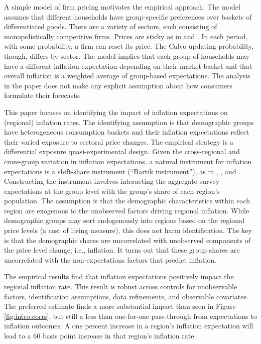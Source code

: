 \documentclass[12pt]{article}
\begin{document}
A simple model of firm pricing motivates the empirical approach. The model assumes that different households have group-specific preferences over baskets of differentiated goods. There are a variety of sectors, each consisting of monopolistically competitive firms. Prices are sticky as in \cite{Calvo:JMoE1983} and \cite{WoodfordBook}. In each period, with some probability, a firm can reset its price. The Calvo updating probability, though, differs by sector. The model implies that each group of households may have a different inflation expectation depending on their market basket and that overall inflation is a weighted average of group-based expectations. The analysis in the paper does not make any explicit assumption about how consumers formulate their forecasts.

This paper focuses on identifying the impact of inflation expectations on (regional) inflation rates. The identifying assumption is that demographic groups have heterogeneous consumption baskets and their inflation expectations reflect their varied exposure to sectoral price changes. The empirical strategy is a differential exposure quasi-experimental design. Given the cross-regional and cross-group variation in inflation expectations, a natural instrument for inflation expectations is a shift-share instrument (``Bartik instrument''), as in \cite{Bartik:1991}, \cite{BlanchardKatz}, and \cite{Almas:AER2012}.  Constructing the instrument involves interacting the aggregate survey expectations at the group level with the group's share of each region's population. The assumption is that the demographic characteristics within each region are exogenous to the unobserved factors driving regional inflation. While demographic groups may sort endogenously into regions based on the regional price levels (a cost of living measure), this does not harm identification. The key is that the demographic shares are uncorrelated with unobserved components of the price level change, i.e., inflation. It turns out that these group shares are uncorrelated with the non-expectations factors that predict inflation.  

The empirical results find that inflation expectations positively impact the regional inflation rate. This result is robust across controls for unobservable factors, identification assumptions, data refinements, and observable covariates. The preferred estimate finds a more substantial impact than seen in Figure \ref{fig:intro:corrs}, but still a less than one-for-one pass-through from expectations to inflation outcomes. A one percent increase in a region's inflation expectation will lead to a 60 basis point increase in that region's inflation rate.  
\end{document}
